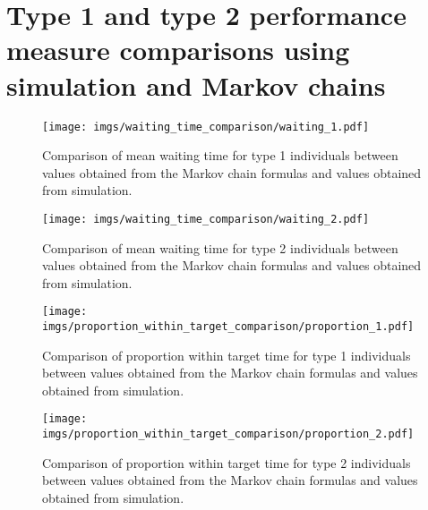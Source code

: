 \section{Type 1 and type 2 performance measure comparisons using simulation and
Markov chains}\label{sec:appendix_additional_figures}

\begin{figure}[H]
    \centering
    \texttt{[image: imgs/waiting\_time\_comparison/waiting\_1.pdf]}
    \caption{
        Comparison of mean waiting time for type 1 individuals between values 
        obtained from the Markov chain formulas and values obtained from 
        simulation.
    }
    \label{fig:markov_vs_des_waiting_time_comparison_1}
\end{figure}

\begin{figure}[H]
    \centering
    \texttt{[image: imgs/waiting\_time\_comparison/waiting\_2.pdf]}
    \caption{
        Comparison of mean waiting time for type 2 individuals between values 
        obtained from the Markov chain formulas and values obtained from 
        simulation.
    }
    \label{fig:markov_vs_des_waiting_time_comparison_2}
\end{figure}

\begin{figure}[H]
    \centering
    \texttt{[image: imgs/proportion\_within\_target\_comparison/proportion\_1.pdf]}
    \caption{
        Comparison of proportion within target time for type 1 individuals 
        between values obtained from the Markov chain formulas and values 
        obtained from simulation. 
    }
    \label{fig:markov_vs_des_proportion_comparison_1}
\end{figure}

\begin{figure}[H]
    \centering
    \texttt{[image: imgs/proportion\_within\_target\_comparison/proportion\_2.pdf]}
    \caption{
        Comparison of proportion within target time for type 2 individuals 
        between values obtained from the Markov chain formulas and values 
        obtained from simulation. 
    }
    \label{fig:markov_vs_des_proportion_comparison_2}
\end{figure}